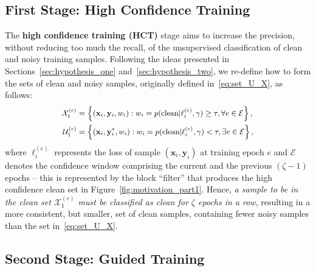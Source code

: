 \documentclass[review]{elsarticle}
\begin{document}
\subsection{First Stage: High Confidence Training}
\label{sec:HCT}



The \textbf{high confidence training (HCT)} stage aims to increase the precision, without reducing too much the recall, of the unsupervised classification of clean and noisy training samples.  
Following the ideas presented in Sections~\ref{sec:hypothesis_one} and~\ref{sec:hypothesis_two},
we re-define how to form the sets of clean and noisy samples, originally defined in~\eqref{eq:set_U_X}, as follows:
\begin{equation}
\small
    \begin{split}
\mathcal{X}_1^{(e)} &= \left \{ (\mathbf{x}_i,\mathbf{y}_i,w_i) : 
w_i=p  ( \text{clean} |   \ell_i^{(e)}  , \gamma  ) \ge \tau, \forall e \in \mathcal{E} \right \}, \\
\mathcal{U}_{1}^{(e)} &= \left \{ (\mathbf{x}_i,\mathbf{y}_i^{*},w_i) : 
w_i=p  ( \text{clean} | \ell_i^{(e)} , \gamma ) < \tau , \exists e \in \mathcal{E} \right \}, 
    \end{split}
\label{eq:redefine_clean_noisy_sets}
\end{equation}
where $\ell_i^{(e)}$ represents the loss of sample $(\mathbf{x}_i,\mathbf{y}_i)$ at training epoch $e$ and $\mathcal{E}$ denotes the confidence window comprising the current and the previous $(\zeta-1)$ epochs -- this is represented by the block ``filter''  that produces the high confidence clean set in Figure~\ref{fig:motivation_part1}.
Hence, \emph{a sample to be in the clean set $\mathcal{X}_1^{(e)}$ must be classified as clean for $\zeta$ epochs in a row}, resulting in a more consistent, but smaller, set of clean samples, containing fewer noisy samples than the set in~\eqref{eq:set_U_X}.




\subsection{Second Stage: Guided Training}
\label{sec:guided_training}
\end{document}
